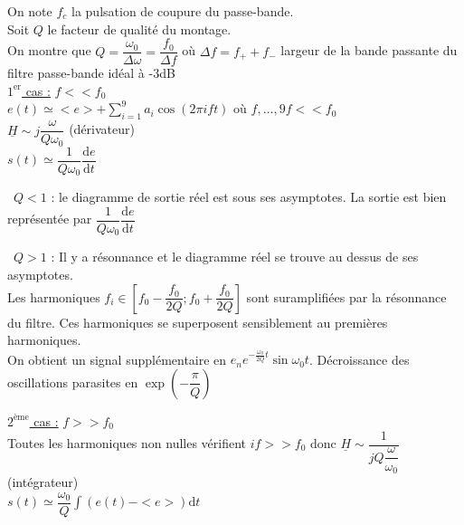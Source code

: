 \documentclass[a4paper]{article}
\begin{document}
\pagestyle{fancy}
\fancyhf{}
\setlength{\headheight}{15pt}

\begin{center}
	\large{}
\end{center}


On note \(f_c\) la pulsation de coupure du passe-bande.\\
Soit \(Q\) le facteur de qualité du montage.\\
On montre que $Q=\dfrac{\omega_0}{\Delta\omega}=\dfrac{f_0}{\Delta f}$ où $\Delta f=f_++f_-$ largeur de la bande passante du filtre passe-bande idéal à -3dB\\

  \underline{$1^{\mathrm{er}}$ cas :} $f<<f_0$\\
  $e(t)\simeq <e>+\displaystyle\sum\limits_{i=1}^{9}a_i\cos(2\pi ift)$ où $f,\ldots,9f<<f_0$\\
  $\underline{H}\sim j \dfrac{\omega}{Q\omega_0}$ (dérivateur)\\
  $s(t)\simeq \dfrac{1}{Q\omega_0}\dfrac{\mathrm{d}e}{\mathrm{d}t}$\par
  \textbullet~$Q<1$ : le diagramme de sortie réel est sous ses asymptotes. La sortie est bien représentée par $\dfrac{1}{Q\omega_0}\dfrac{\mathrm{d}e}{\mathrm{d}t}$\par
  \textbullet~$Q>1$ : Il y a résonnance et le diagramme réel se trouve au dessus de ses asymptotes.\\
  Les harmoniques $f_i\in \left[f_0- \dfrac{f_0}{2Q};f_0+\dfrac{f_0}{2Q}\right]$ sont suramplifiées par la résonnance du filtre. Ces harmoniques se superposent sensiblement au premières harmoniques.\\
  On obtient un signal supplémentaire en $e_n e^{-\frac{\omega_0}{2Q}t}\sin\omega_0t$. Décroissance des oscillations parasites en $\exp(- \dfrac{\pi}{Q})$

  \underline{$2^{\mathrm{ème}}$ cas :} $f>>f_0$\\
  Toutes les harmoniques non nulles vérifient $if>>f_0$ donc $\underline{H}\sim \dfrac{1}{jQ \dfrac{\omega}{\omega_0}}$ (intégrateur)\\
  $s(t)\simeq \dfrac{\omega_0}{Q}\displaystyle\int{}{}(e(t)-<e>)\mathrm{d}t$
\end{document}
